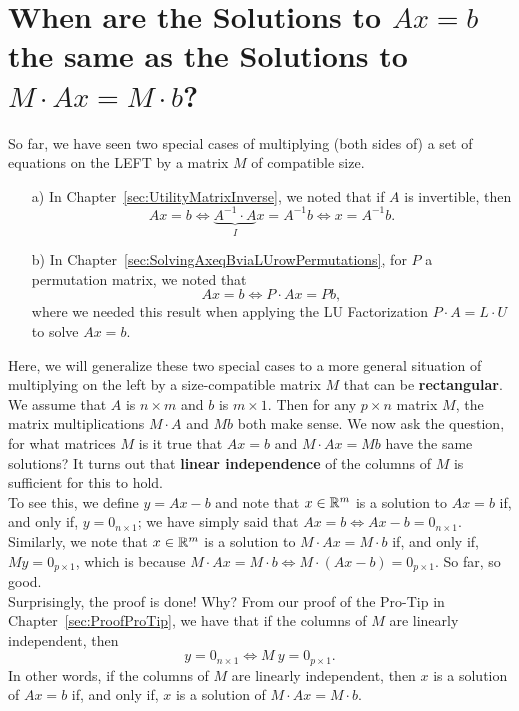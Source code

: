 \section{When are the Solutions to $Ax=b$ the same as the Solutions to $M \cdot A x = M \cdot b$?}

So far, we have seen two special cases of multiplying (both sides of) a set of equations on the LEFT by a matrix $M$ of compatible size. 
\begin{enumerate}
    \item[a)] In Chapter~\ref{sec:UtilityMatrixInverse}, we noted that if $A$ is invertible, then
    $$ A x = b \iff \underbrace{A^{-1} \cdot A}_{I} x =  A^{-1}  b \iff x =  A^{-1} b.$$

    \item[b)] In Chapter~\ref{sec:SolvingAxeqBviaLUrowPermutations}, for $P$ a permutation matrix, we noted that
    $$ Ax = b \iff P \cdot A x = P b,$$
    where we needed this result when applying the LU Factorization $P \cdot A = L \cdot U$ to solve $Ax = b$. 
\end{enumerate}
Here, we will generalize these two special cases to a more general situation of multiplying on the left by a size-compatible matrix $M$ that can be \textbf{rectangular}.\\

We assume that $A$ is $n \times m$ and $b$ is $m \times 1$. Then for any $p \times n$ matrix $M$, the matrix multiplications $M \cdot A$ and $M b$ both make sense. We now ask the question, for what matrices $M$ is it true that $Ax = b$ and $M \cdot A x = M b$ have the same solutions? It turns out that \textbf{linear independence} of the columns of $M$ is sufficient for this to hold.\\

To see this, we define $y = Ax - b$ and note that $x \in \mathbb R^m$ is a solution to $Ax=b$ if, and only if, $y = 0_{n \times 1}$; we have simply said that $Ax = b \iff Ax - b = 0_{n \times 1}$. Similarly, we note that $x \in \mathbb R^m$ is a solution to $M \cdot A x = M \cdot b$ if, and only if, $M y = 0_{p\times 1}$, which is because $M \cdot A x = M \cdot b \iff M \cdot(A x - b) = 0_{p \times 1}$. So far, so good. \\

Surprisingly, the proof is done! Why? From our proof of the Pro-Tip in Chapter~\ref{sec:ProofProTip}, we have that if the columns of $M$ are linearly independent, then 
$$y = 0_{n \times 1} \iff M ~y = 0_{ p \times 1}.$$
In other words, if the columns of $M$ are linearly independent, then $x$ is a solution of $Ax = b$ if, and only if, $x$ is a solution of  $M \cdot A x = M \cdot b$. \\

